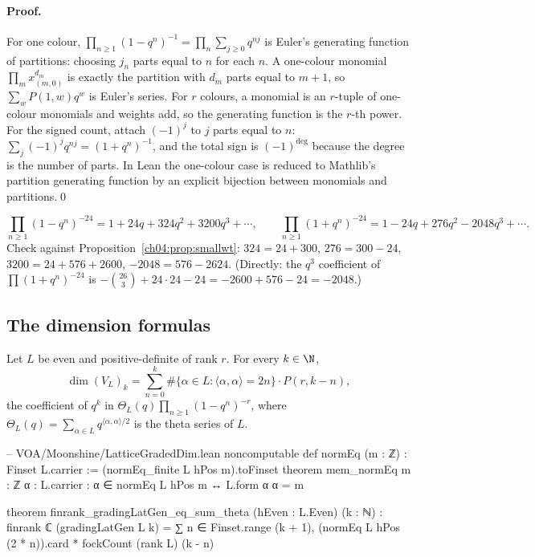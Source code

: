 \paragraph{Proof.} For one colour, $\prod_{n\ge1}(1-q^n)^{-1}=\prod_n\sum_{j\ge0}q^{nj}$ is Euler's
generating function of partitions: choosing $j_n$ parts equal to $n$ for each $n$. A one-colour
monomial $\prod_m x_{(m,0)}^{d_m}$ is exactly the partition with $d_m$ parts equal to $m+1$, so
$\sum_wP(1,w)q^w$ is Euler's series. For $r$ colours, a monomial is an $r$-tuple of one-colour
monomials and weights add, so the generating function is the $r$-th power. For the signed count,
attach $(-1)^{j}$ to $j$ parts equal to $n$: $\sum_j(-1)^jq^{nj}=(1+q^n)^{-1}$, and the total sign is
$(-1)^{\deg}$ because the degree is the number of parts. In Lean the one-colour case is reduced to
Mathlib's partition generating function by an explicit bijection between monomials and
partitions.\qed

\begin{example}[Low coefficients for $r=24$]\label{ch04:ex:fock24}
\begin{equation*}
  \prod_{n\ge1}(1-q^n)^{-24}=1+24q+324q^2+3200q^3+\cdots,\qquad
  \prod_{n\ge1}(1+q^n)^{-24}=1-24q+276q^2-2048q^3+\cdots.
\end{equation*}
Check against Proposition~\ref{ch04:prop:smallwt}: $324=24+300$, $276=300-24$, $3200=24+576+2600$,
$-2048=576-2624$. (Directly: the $q^3$ coefficient of $\prod(1+q^n)^{-24}$ is
$-\binom{26}3+24\cdot24-24=-2600+576-24=-2048$.)
\end{example}

\subsection{The dimension formulas}

\begin{theorem}\label{ch04:thm:dimVL}
Let $L$ be even and positive-definite of rank $r$. For every $k\in\N$,
\begin{equation*}
  \dim(V_L)_k=\sum_{n=0}^{k}\#\{\alpha\in L:\langle\alpha,\alpha\rangle=2n\}\cdot P(r,k-n),
\end{equation*}
the coefficient of $q^k$ in $\Theta_L(q)\prod_{n\ge1}(1-q^n)^{-r}$, where
$\Theta_L(q)=\sum_{\alpha\in L}q^{\langle\alpha,\alpha\rangle/2}$ is the theta series of $L$.
\end{theorem}

\begin{leancode}
-- VOA/Moonshine/LatticeGradedDim.lean
noncomputable def normEq (m : ℤ) : Finset L.carrier := (normEq_finite L hPos m).toFinset
theorem mem_normEq {m : ℤ} {α : L.carrier} : α ∈ normEq L hPos m ↔ L.form α α = m

theorem finrank_gradingLatGen_eq_sum_theta (hEven : L.Even) (k : ℕ) :
    finrank ℂ (gradingLatGen L k)
      = ∑ n ∈ Finset.range (k + 1), (normEq L hPos (2 * n)).card * fockCount (rank L) (k - n)
\end{leancode}

